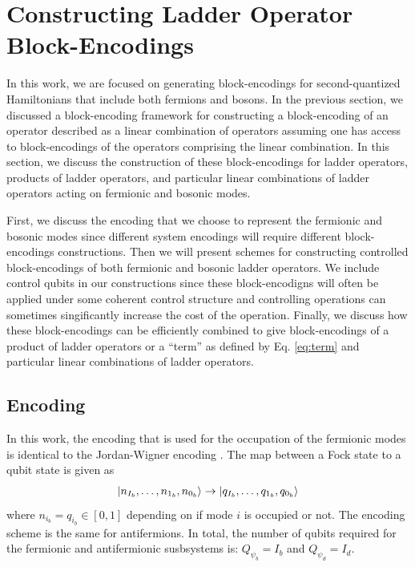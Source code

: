 \section{Constructing Ladder Operator Block-Encodings}
\label{sec:ladder-op-oracles}

In this work, we are focused on generating block-encodings for second-quantized Hamiltonians that include both fermions and bosons.
In the previous section, we discussed a block-encoding framework for constructing a block-encoding of an operator described as a linear combination of operators assuming one has access to block-encodings of the operators comprising the linear combination.
In this section, we discuss the construction of these block-encodings for ladder operators, products of ladder operators, and particular linear combinations of ladder operators acting on fermionic and bosonic modes.

First, we discuss the encoding that we choose to represent the fermionic and bosonic modes since different system encodings will require different block-encodings constructions.
Then we will present schemes for constructing controlled block-encodings of both fermionic and bosonic ladder operators.
We include control qubits in our constructions since these block-encodigns will often be applied under some coherent control structure and controlling operations can sometimes singificantly increase the cost of the operation.
Finally, we discuss how these block-encodings can be efficiently combined to give block-encodings of a product of ladder operators or a ``term'' as defined by Eq. \ref{eq:term} and particular linear combinations of ladder operators.   

\subsection{Encoding}
\label{subsec:encoding}

In this work, the encoding that is used for the occupation of the fermionic modes is identical to the Jordan-Wigner encoding \cite{jordan-wigner}.
The map between a Fock state to a qubit state is given as 
\begin{equation}
    \ket{n_{I_b}, \dots, n_{1_b}, n_{0_b}} \rightarrow \ket{q_{I_b}, \dots, q_{1_b}, q_{0_b}}
\end{equation}
where $n_{i_b} = q_{i_b} \in [0, 1]$ depending on if mode $i$ is occupied or not.
The encoding scheme is the same for antifermions.
In total, the number of qubits required for the fermionic and antifermionic susbsystems is: $Q_{\psi_b} = I_b$ and $Q_{\psi_d} = I_d$.

